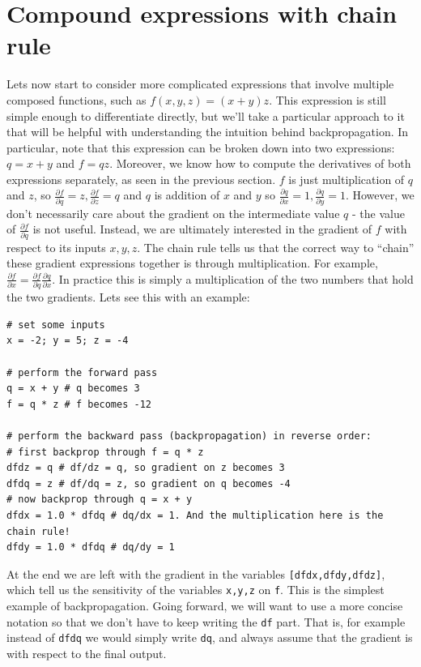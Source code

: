 \section*{Compound expressions with chain rule}

Lets now start to consider more complicated expressions that involve multiple composed functions, such as $f(x,y,z) = (x + y) z$. This expression is still simple enough to differentiate directly, but we’ll take a particular approach to it that will be helpful with understanding the intuition behind backpropagation. In particular, note that this expression can be broken down into two expressions: $q=x+y$ and $f=qz$. Moreover, we know how to compute the derivatives of both expressions separately, as seen in the previous section. $f$ is just multiplication of $q$ and $z$, so $\frac{\partial f}{\partial q} = z, \frac{\partial f}{\partial z} = q$ and $q$ is addition of $x$ and $y$ so $\frac{\partial q}{\partial x} = 1, \frac{\partial q}{\partial y} = 1$. However, we don’t necessarily care about the gradient on the intermediate value $q$ - the value of $\frac{\partial f}{\partial q}$ is not useful. Instead, we are ultimately interested in the gradient of $f$ with respect to its inputs $x,y,z$. The chain rule tells us that the correct way to ``chain” these gradient expressions together is through multiplication. For example, $\frac{\partial f}{\partial x} = \frac{\partial f}{\partial q} \frac{\partial q}{\partial x}$. In practice this is simply a multiplication of the two numbers that hold the two gradients. Lets see this with an example:

\begin{lstlisting}[frame=single]
# set some inputs
x = -2; y = 5; z = -4

# perform the forward pass
q = x + y # q becomes 3
f = q * z # f becomes -12

# perform the backward pass (backpropagation) in reverse order:
# first backprop through f = q * z
dfdz = q # df/dz = q, so gradient on z becomes 3
dfdq = z # df/dq = z, so gradient on q becomes -4
# now backprop through q = x + y
dfdx = 1.0 * dfdq # dq/dx = 1. And the multiplication here is the chain rule!
dfdy = 1.0 * dfdq # dq/dy = 1
\end{lstlisting}

At the end we are left with the gradient in the variables \texttt{[dfdx,dfdy,dfdz]}, which tell us the sensitivity of the variables \texttt{x,y,z} on \texttt{f}. This is the simplest example of backpropagation. Going forward, we will want to use a more concise notation so that we don’t have to keep writing the \texttt{df} part. That is, for example instead of \texttt{dfdq} we would simply write \texttt{dq}, and always assume that the gradient is with respect to the final output.

